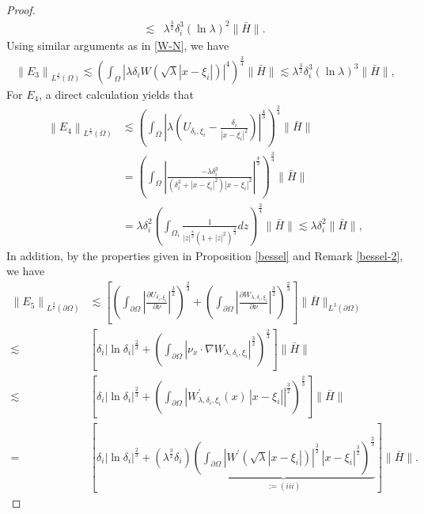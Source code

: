 \documentclass[a4paper,reqno,11pt,oneside]{amsart}
\numberwithin{equation}{section}
\begin{document}
\begin{proof}
{\begin{align*}
\lesssim&\lambda^{\frac{3}{2}}\delta_i^3\left(\ln{\lambda}\right)^{2}\|\bar H\|.
\end{align*}}
Using similar arguments as in \eqref{W-N}, we have
\begin{align*}
      \left\|E_3\right\|_{L^{\frac{4}{3}}(\Omega)}\lesssim\left(\displaystyle\int_{\Omega}\left|\lambda\delta_i W\left(\sqrt{\lambda}|x-\xi_i|\right)\right|^4\right)^{\frac{3}{4}}\|\bar H\|\lesssim \lambda^{\frac{3}{2}}\delta_i^3\left(\ln{\lambda}\right)^{3}\|\bar H\|,\end{align*}
For $E_4$, a direct calculation yields that
\begin{align*}
    \left\|E_4\right\|_{L^{\frac{4}{3}}(\Omega)}&\lesssim \left(\displaystyle\int_{\Omega}\left|\lambda\left(U_{ {\delta_i}, {\xi_i}}-\frac{\delta_i}{|x-\xi_i|^{2}}\right)\right|^{\frac{4}{3}}\right)^{\frac{3}{4}}\|\bar H\|\\&=\left(\displaystyle\int_{\Omega}\left|\frac{-\lambda\delta_i^3}{\left(\delta_i^2+|x-\xi_i|^2\right)|x-\xi_i|^{2}}\right|^{\frac{4}{3}}\right)^{\frac{3}{4}}\|\bar H\|\\&=\lambda\delta_i^2\left(\displaystyle\int_{\Omega_i}\frac{1}{|z|^{\frac{8}{3}}\left(1+|z|^2\right)^{\frac{4}{3}}}dz\right)^{\frac{3}{4}}\|\bar H\|\lesssim\lambda\delta_i^2\|\bar H\|,
\end{align*}
In addition, by the properties given in Proposition \ref{bessel} and Remark \ref{bessel-2}, {we have}
\begin{align*}
       \left\|E_5\right\|_{L^{\frac{3}{2}}(\partial\Omega)}&\lesssim\left[\left(\displaystyle{\int_{\partial\Omega}}\left|\frac{\partial U_{ {\delta_i}, {\xi_i}}}{\partial \nu}\right|^{\frac{3}{2}}\right)^{\frac{2}{3}}+ \left(\displaystyle{\int_{\partial\Omega}}\left|\frac{\partial W_{\lambda, {\delta_i}, {\xi_i}}}{\partial \nu}\right|^{\frac{3}{2}}\right)^{\frac{2}{3}}\right]\|\bar H\|_{L^{3}(\partial\Omega)}\\\lesssim&\left[\delta_i|\ln{\delta_i}|^{\frac{2}{3}}+\left(\displaystyle{\int_{\partial\Omega}}\left|\nu_x\cdot\nabla W_{\lambda, {\delta_i}, {\xi_i}}\right|^{\frac{3}{2}}\right)^{\frac{2}{3}}\right]\|\bar H\|\\\lesssim&\left[\delta_i|\ln{\delta_i}|^{\frac{2}{3}}+\left(\displaystyle{\int_{\partial\Omega}}\left| W^{\prime}_{\lambda, {\delta_i}, {\xi_i}}(x)\,|x-\xi_i|\right|^{\frac{3}{2}}\right)^{\frac{2}{3}}\right]\|\bar H\|\\=&\left[\delta_i|\ln{\delta_i}|^{\frac{2}{3}}+\left(\lambda^{\frac{3}2}\delta_i\right)\underbrace{\left(\displaystyle{\int_{\partial\Omega}}\left| W^{\prime}\left(\sqrt{\lambda}|x-\xi_i|\right)\right|^{\frac{3}{2}}\,|x-\xi_i|^{\frac{3}{2}}\right)^{\frac{2}{3}}}_{:=(iii)}\right]\|\bar H\|.

\end{align*}
\end{proof}
\end{document}
